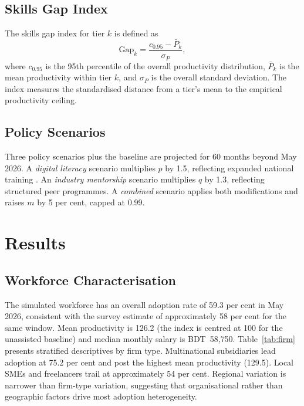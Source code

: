 \documentclass[11pt,a4paper]{article}
\begin{document}
\subsection{Skills Gap Index}

The skills gap index for tier $k$ is defined as
\begin{equation}
  \mathrm{Gap}_k = \frac{c_{0.95} - \bar{P}_k}{\sigma_P},
  \label{eq:gap}
\end{equation}
where $c_{0.95}$ is the 95th percentile of the overall productivity
distribution, $\bar{P}_k$ is the mean productivity within tier $k$,
and $\sigma_P$ is the overall standard deviation. The index measures
the standardised distance from a tier's mean to the empirical
productivity ceiling.

\subsection{Policy Scenarios}

Three policy scenarios plus the baseline are projected for 60 months
beyond May 2026. A \emph{digital literacy} scenario multiplies $p$
by 1.5, reflecting expanded national training
\citep{a2iDigitalLiteracy2024}. An \emph{industry mentorship}
scenario multiplies $q$ by 1.3, reflecting structured peer
programmes. A \emph{combined} scenario applies both modifications
and raises $m$ by 5 per cent, capped at 0.99.

\section{Results}
\label{sec:results}

\subsection{Workforce Characterisation}

The simulated workforce has an overall adoption rate of 59.3 per
cent in May 2026, consistent with the \citet{IslamKabir2025} survey
estimate of approximately 58 per cent for the same window. Mean
productivity is 126.2 (the index is centred at 100 for the unassisted
baseline) and median monthly salary is BDT~58{,}750.
Table~\ref{tab:firm} presents stratified descriptives by firm type.
Multinational subsidiaries lead adoption at 75.2 per cent and post
the highest mean productivity (129.5). Local SMEs and freelancers
trail at approximately 54 per cent. Regional variation is narrower
than firm-type variation, suggesting that organisational rather than
geographic factors drive most adoption heterogeneity.
\end{document}
